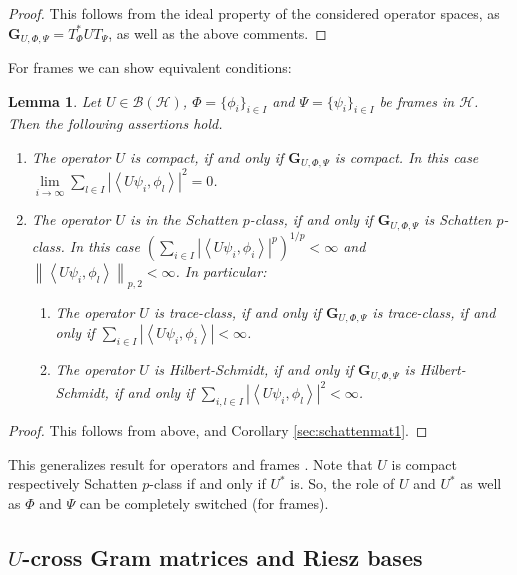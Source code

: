 \documentclass{birkjour}
\newtheorem{lem}[thm]{Lemma}
\theoremstyle{definition}
\theoremstyle{remark}
\numberwithin{equation}{section}
\newcommand{\BL}[1]{
{\mathcal B} \left( #1 \right)
}
\begin{document}
\begin{proof}
This follows from the ideal property of the considered operator spaces, as $\mathbf{G}_{U,\Phi,\Psi}=T_{\Phi}^{*}UT_{\Psi}$, as well as the above comments.
\end{proof}

For frames we can show equivalent conditions:
\begin{lem}
Let $U\in \BL{\mathcal{H}}$, $\Phi=\{\phi_{i}\}_{i\in I}$ and $\Psi=\{\psi_{i}\}_{i\in I}$
be frames in $\mathcal{H}$.
Then the following assertions hold.

\begin{enumerate}
\item[(1)]  The operator $U$ is compact, if and only if $\mathbf{G}_{U,\Phi,\Psi}$ is compact. In this case $\lim \limits_{i\rightarrow \infty} \sum \limits_{l\in I}  \left| \left\langle U\psi_{i},\phi_{l}\right\rangle \right|^2=0$. 
\item[(2)]  The operator $U$ is in the Schatten $p$-class, if and only if $\mathbf{G}_{U,\Phi,\Psi}$ is Schatten $p$-class. In this case $\left(\sum \limits_{i\in I} \left| \left< U \psi_{i},\phi_{i} \right> \right|^p \right)^{1/p}<\infty$  and $\left\|\left< U \psi_{i},\phi_{l} \right> \right\|_{p,2} < \infty$.
In particular:
\begin{enumerate}
\item[(2a.)] The operator $U$ is trace-class, if and only if $\mathbf{G}_{U,\Phi,\Psi}$ is trace-class, if and only if $\sum \limits_{i\in I} \left| \left\langle U\psi_{i},\phi_{i}\right\rangle \right| < \infty$.
\item[(2b.)] The operator $U$ is Hilbert-Schmidt, if and only if $\mathbf{G}_{U,\Phi,\Psi}$ is Hilbert-Schmidt, if and only if $\sum \limits_{i,l\in I} \left|\left\langle U\psi_{i},\phi_{l}\right\rangle\right|^{2}<\infty$.
\end{enumerate}
 \end{enumerate}
\end{lem}
\begin{proof} This follows from above, 
and Corollary \ref{sec:schattenmat1}.
\end{proof}
This generalizes result for operators and frames \cite{bikhzh15}.
Note that $U$ is compact respectively Schatten $p$-class if and only if $U^*$ is. So, the role of $U$ and $U^*$ as well as $\Phi$ and $\Psi$ can be completely switched (for frames).


\subsection{$U$-cross Gram matrices and Riesz bases}
\end{document}
